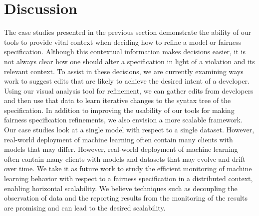 
\section{Discussion} %
The case studies presented in the previous section demonstrate the ability of our tools to provide vital context when deciding how to refine a model or fairness specification.
Although this contextual information makes decisions easier, it is not always clear how one should alter a specification in light of a violation and its relevant context.
To assist in these decisions, we are currently examining ways work to suggest edits that are likely to achieve the desired intent of a developer.
Using our visual analysis tool for refinement, we can gather edits from developers and then use that data to learn iterative changes to the syntax tree of the specification.
In addition to improving the usability of our tools for making fairness specification refinements, we also envision a more scalable framework.
Our case studies look at a single model with respect to a single dataset. However, real-world deployment of machine learning often contain many clients with models that may differ.
However, real-world deployment of machine learning often contain many clients with models and datasets that may evolve and drift over time.
We take it as future work to study the efficient monitoring of machine learning behavior with respect to a fairness specification in a distributed context, enabling horizontal scalability.
We believe techniques such as decoupling the observation of data and the reporting results from the monitoring of the results are promising and can lead to the desired scalability.


